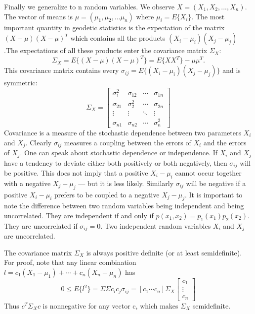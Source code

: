 	Finally we generalize to n random variables. We observe $X=(X_1,X_2,...,X_n)$.
	The vector of means is $\mu=(\mu_1,\mu_2,...\mu_n)$ where $\mu_i=E\{X_i\}$. The most important
	quantity in geodetic statistics is the expectation of the matrix $(X-\mu)(X-\mu)^T$ which
	contains all the products $(X_i-\mu_i)(X_j-\mu_j)$ .The expectations of all these products enter
	the covariance matrix $\Sigma_X$:
	\begin{equation}
	\Sigma_X=E\{(X-\mu)(X-\mu)^T\}=E\{XX^T\}-\mu\mu^T.
	\end{equation}
	This covariance matrix contains every $\sigma_{ij}=E\{(X_i-\mu_i)(X_j-\mu_j)\}$ and is symmetric:
	\begin{equation}
	\Sigma_X=
	\begin{bmatrix}
	\sigma^2_1 & \sigma_{12} &\cdots & \sigma_{1n}\\
	\sigma_{21} & \sigma^2_2 &\cdots & \sigma_{2n}\\
	\vdots & \vdots & \ddots &\vdots \\
	\sigma_{n1} & \sigma_{n2} &\cdots & \sigma^2_n 
	\end{bmatrix}
	\end{equation}
	Covariance is a measure of the stochastic dependence between two parameters $X_i$ and $X_j$.
	Clearly $\sigma_{ij}$ measures a coupling between the errors of $X_i$ and the errors of $X_j$. One can speak about stochastic dependence or independence. If $X_i$ and $X_j$ have a tendency to deviate either both positively or both negatively, then $\sigma_{ij}$ will be positive. This does not imply that a positive $X_i-\mu_i$ cannot occur together with a negative $X_j-\mu_j$ — but it is less likely. Similarly $\sigma_{ij}$ will be negative if a positive $X_i-\mu_i$ prefers to be coupled to a negative $X_j-\mu_j$. It is important to note the difference between two random variables being independent and being uncorrelated. They are independent if and only if $p(x_1,x_2)=p_1(x_1)p_2(x_2)$. They are uncorrelated if $\sigma_{ij}=0$. Two independent random variables $X_i$ and $X_j$ are uncorrelated.
	
	The covariance  matrix $\Sigma_X$ is always positive definite (or at least semidefinite). For proof, note that any linear combination $l=c_1(X_1-\mu_1)+\cdots+c_n(X_n-\mu_n)$ has
	\begin{equation}
	0\leq E\{l^2\}=\Sigma\Sigma c_ic_j\sigma_{ij}=[c_1 \cdots c_n]\Sigma_X
	\begin{bmatrix}
	c_1\\
	\vdots\\
	c_n
	\end{bmatrix}
	\end{equation}
	Thus $c^T\Sigma_Xc$ is nonnegative for any vector c, which makes $\Sigma_X$ semidefinite.
	
